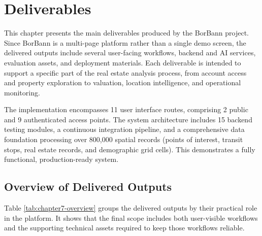 \chapter{Deliverables}

This chapter presents the main deliverables produced by the BorBann project. Since BorBann is a multi-page platform rather than a single demo screen, the delivered outputs include several user-facing workflows, backend and AI services, evaluation assets, and deployment materials. Each deliverable is intended to support a specific part of the real estate analysis process, from account access and property exploration to valuation, location intelligence, and operational monitoring.

The implementation encompasses 11 user interface routes, comprising 2 public and 9 authenticated access points. The system architecture includes 15 backend testing modules, a continuous integration pipeline, and a comprehensive data foundation processing over 800,000 spatial records (points of interest, transit stops, real estate records, and demographic grid cells). This demonstrates a fully functional, production-ready system.

\section{Overview of Delivered Outputs}

Table \ref{tab:chapter7-overview} groups the delivered outputs by their practical role in the platform. It shows that the final scope includes both user-visible workflows and the supporting technical assets required to keep those workflows reliable.

